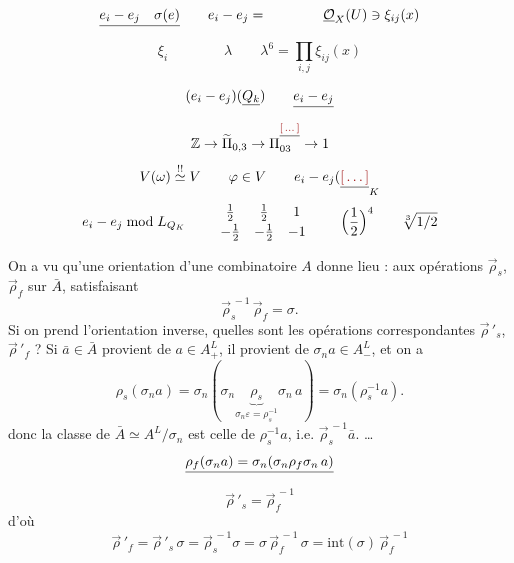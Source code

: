 \documentclass[11pt,a4paper]{article}
\begin{document}
  


\[
\struck{e_i - e_j \quad \sigma(e)} \qquad e_i - e_j =
\qquad\qquad
\underline{\mathcal{O}}_X(U) \ni \xi_{ij}(x)
\]
\[
\xi_i \qquad\qquad
\lambda \qquad \lambda^6 = \prod_{i,j} \xi_{ij}(x)
\]


\[
(e_i - e_j)(\underline{Q_k}) \qquad \struck{e_i - e_j}
\]
\[
\mathbb{Z} \to \widetilde{\Pi}_{0,3} \to \Pi^{\struck{\ill{}}}_{03} \to 1
\]
\[
V(\omega) \overset{!!}{\simeq} V \qquad \varphi \in V \qquad
e_i - e_j(\struck{\ill{}}_K
\]
\[
e_i - e_j \bmod L_{Q_K}
\qquad
\begin{array}{ccc}
\frac12 & \frac12 & 1 \\[2pt]
-\frac12 & -\frac12 & -1
\end{array}
\qquad \Bigl(\frac12\Bigr)^4 \qquad \sqrt[3]{1/2}
\]



On a vu qu'une orientation d'une 
\ill{} combinatoire $A$ donne lieu : aux opérations $\vec\rho_s$,
$\vec\rho_f$ sur $\bar A$, satisfaisant
\[
\vec\rho_s^{\,-1}\,\vec\rho_f = \sigma .
\]
Si on prend l'orientation inverse, quelles sont les opérations
correspondantes $\vec\rho\,'_s$, $\vec\rho\,'_f$ ? Si $\bar a \in \bar A$
provient de $a \in A^L_+$, il provient de $\sigma_n a \in A^L_-$, et on a
\[
\rho_s(\sigma_n a) = \sigma_n(\sigma_n \underbrace{\rho_s}_{\sigma_n \varepsilon = \rho_s^{-1}} \sigma_n\, a)
= \sigma_n(\rho_s^{-1} a) .
\]
donc la classe de $\bar A \simeq A^L/\sigma_n$ est celle de
$\rho_s^{-1} a$, i.e. $\vec\rho_s^{\,-1} \bar a$. \struck{\ill{}} \ill{}
…
\[
\struck{\rho_f(\sigma_n a) = \sigma_n(\sigma_n \rho_f \sigma_n\, a)}
\]
\[
\vec\rho\,'_s = \vec\rho_f^{\,-1}
\]
d'où
\[
\vec\rho\,'_f = \vec\rho\,'_s\,\sigma = \vec\rho_s^{\,-1}\sigma
= \sigma\,\vec\rho_f^{\,-1}\,\sigma = \mathrm{int}(\sigma)\,\vec\rho_f^{\,-1}
\]
\end{document}
